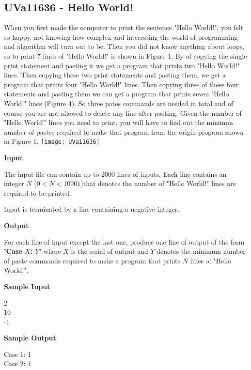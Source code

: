 \graphicspath{{CPE/Star1/image/}}
\subsection{UVa11636 - Hello World!}
When you first made the computer to print the sentence "Hello World!", you felt so happy, not knowing how complex and interesting the world of programming and algorithm will turn out to be. Then you did not know anything about loops, so to print 7 lines of "Hello World!" is shown in Figure 1. By of copying the single print statement and pasting it we get a program that prints two "Hello World!" lines. Then copying these two print statements and pasting them, we get a program that prints four "Hello World!" lines. Then copying three of these four statements and pasting them we can get a program that prints seven "Hello World!" lines (Figure 4). So three pates commands are needed in total and of course you are not allowed to delete any line after pasting. Given the number of "Hello World!" lines you need to print, you will have to find out the minimun number of pastes required to make that program from the origin program shown in Figure 1.
\texttt{[image: UVa11636]}

\begin{flushleft}
{\color{red} \textbf{Input}}
\end{flushleft}
The input file can contain up to 2000 lines of inputs. Each line contains an integer $N$ ($0 < N < 10001$)that denotes the number of "Hello World!" lines are required to be printed.

Input is terminated by a line containing a negative integer.

\begin{flushleft}
{\color{red} \textbf{Output}}
\end{flushleft}
For each line of input except the last one, produce one line of output of the form \textbf{'Case $X$: $Y$'} where $X$ is the serial of output and $Y$ denotes the minimum number of paste commands required to make a program that prints $N$ lines of "Hello World!".

\begin{flushleft}
{\color{red} \textbf{Sample Input}}
\end{flushleft}
\begin{flushleft}
2\\
10\\
-1\\
\end{flushleft}

\begin{flushleft}
{\color{red} \textbf{Sample Output}}
\end{flushleft}
\begin{flushleft}
Case 1: 1\\
Case 2: 4\\
\end{flushleft}

\newpage